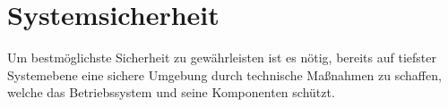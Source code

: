 \section{Systemsicherheit}\label{sec:systemsec}
	Um bestmöglichste Sicherheit zu gewährleisten ist es nötig, bereits auf
	tiefster Systemebene eine sichere Umgebung durch technische Maßnahmen
	zu schaffen, welche das Betriebssystem und seine Komponenten schützt.
